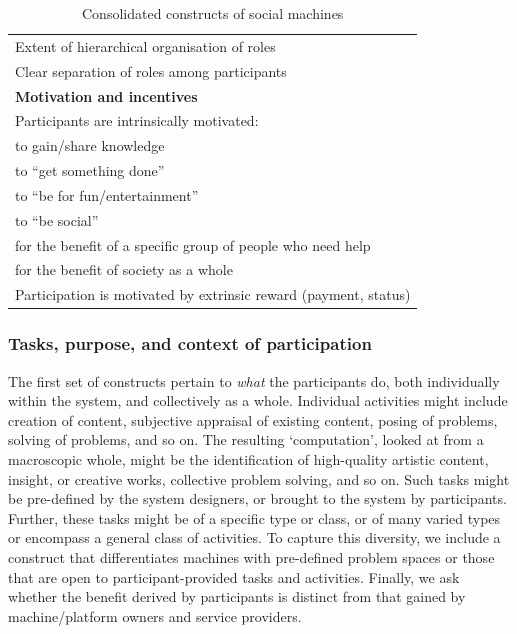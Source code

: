 \documentclass{www13-companion-accepted}
\begin{document}
\begin{table}[htb]
\begin{center}
\begin{scriptsize}
\begin{tabular}{|p{8cm}|}
Extent of hierarchical organisation of roles \\
Clear separation of roles among participants \\
\hline
{\bf Motivation and incentives} \\
\hline
Participants are intrinsically motivated:\\
\hspace{1cm} to gain/share knowledge \\
\hspace{1cm} to ``get something done'' \\
\hspace{1cm} to ``be for fun/entertainment''\\
\hspace{1cm} to ``be social'' \\
\hspace{1cm} for the benefit of a specific group of people who need help \\
\hspace{1cm} for the benefit of society as a whole \\
Participation is motivated by extrinsic reward (payment, status) \\
\hline

\end{tabular}
\end{scriptsize}
\end{center}
\caption{Consolidated constructs of social machines} \label{table:constructs}
\end{table}

\subsubsection{Tasks, purpose, and context of participation}
The first set of constructs pertain to \emph{what} the participants
do, both individually within the system, and collectively as a whole.
Individual activities might include creation of content, subjective
appraisal of existing content, posing of problems, solving of
problems, and so on. The resulting `computation', looked at from a
macroscopic whole, might be the identification of high-quality
artistic content, insight, or creative works, collective problem
solving, and so on. Such tasks might be pre-defined by the system
designers, or brought to the system by participants. Further, these
tasks might be of a specific type or class, or of many varied types or
encompass a general class of activities. To capture this diversity,
we include a construct that differentiates machines with pre-defined problem spaces or those that are open to participant-provided tasks and activities. Finally, we ask whether the benefit derived by
participants is distinct from that gained by machine/platform owners
and service providers.
\end{document}
